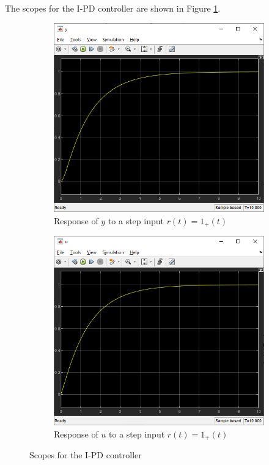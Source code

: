 The scopes for the I-PD controller are shown in Figure \ref{fig:Q1IPDScopes}.
\begin{figure}[h]
    \centering
    \begin{subfigure}[b]{0.45\linewidth}
        \includegraphics[width=\linewidth]{Questions/Figures/Q1IPDy.png}
        \caption{Response of $y$ to a step input $r(t) = 1_{+}(t)$}
    \end{subfigure}
    \begin{subfigure}[b]{0.45\linewidth}
        \includegraphics[width=\linewidth]{Questions/Figures/Q1IPDu.png}
        \caption{Response of $u$ to a step input $r(t) = 1_{+}(t)$}
    \end{subfigure}
    \caption{Scopes for the I-PD controller}
    \label{fig:Q1IPDScopes}
\end{figure}

